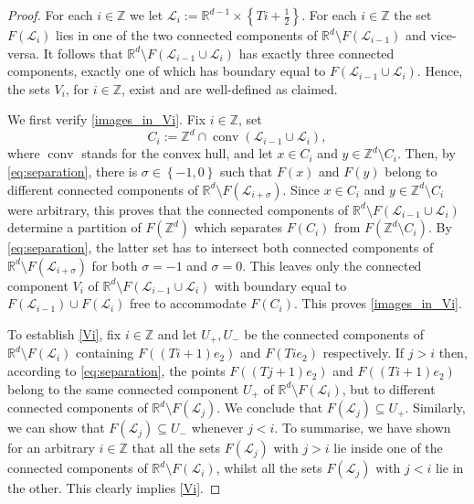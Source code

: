 \documentclass[a4paper, bibliography=totoc]{scrartcl}
\numberwithin{claimcounter}{define}
\newcommand{\R}{\mathbb{R}}
\newcommand{\Z}{\mathbb{Z}}
\DeclareMathOperator{\conv}{conv}
\newcommand{\mc}[1]{\mathcal{#1}}
\newcommand{\set}[1]{\left\{#1\right\}}
\newcommand{\br}[1]{\left(#1\right)}
\begin{document}
\begin{proof}
	For each $i\in\Z$ we let $\mc{L}_{i}:=\R^{d-1}\times\set{Ti+\frac{1}{2}}$. For each $i\in\Z$ the set $F(\mc{L}_{i})$ lies in one of the two connected components of $\R^{d}\setminus F(\mc{L}_{i-1})$ and vice-versa. It follows that $\R^{d}\setminus F\br{\mc{L}_{i-1}\cup\mc{L}_{i}}$ has exactly three connected components, exactly one of which has boundary equal to $F(\mc{L}_{i-1}\cup\mc{L}_{i})$. Hence, the sets $V_{i}$, for $i\in\Z$, exist and are well-defined as claimed.
	
	We first verify  \eqref{images_in_Vi}. Fix $i\in\Z$, set 
	\begin{equation*}
	C_{i}:=\Z^{d}\cap \conv\br{\mc{L}_{i-1}\cup\mc{L}_{i}},
	\end{equation*}
	where $\conv$ stands for the convex hull, and let $x\in C_{i}$ and $y\in \Z^{d}\setminus C_{i}$.
	Then, by \eqref{eq:separation}, there is $\sigma\in\set{-1,0}$ such that $F(x)$ and $F(y)$ belong to different connected components of $\R^{d}\setminus F(\mc{L}_{i+\sigma})$. Since $x\in C_{i}$ and $y\in \Z^{d}\setminus C_{i}$ were arbitrary, this proves that the connected components of $\R^{d}\setminus F(\mc{L}_{i-1}\cup \mc{L}_{i})$ determine a partition of $F(\Z^{d})$ which separates $F\br{C_{i}}$ from $F\br{\Z^{d}\setminus C_{i}}$. By \eqref{eq:separation}, the latter set has to intersect both connected components of $\R^{d}\setminus F(\mc{L}_{i+\sigma})$ for both $\sigma=-1$ and $\sigma=0$. This leaves only the connected component $V_{i}$ of $\R^{d}\setminus F(\mc{L}_{i-1}\cup \mc{L}_{i})$ with boundary equal to $F(\mc{L}_{i-1})\cup F(\mc{L}_{i})$ free to accommodate $F\br{C_{i}}$. This proves \eqref{images_in_Vi}.	
	
	To establish \eqref{Vi}, fix $i\in \Z$ and let $U_{+},U_{-}$ be the connected components of $\R^{d}\setminus F\br{\mc{L}_{i}}$ containing $F\br{\br{Ti+1}e_{2}}$ and $F\br{Tie_{2}}$ respectively. If $j>i$ then, according to \eqref{eq:separation}, the points $F\br{\br{Tj+1}e_{2}}$ and $F\br{\br{Ti+1}e_{2}}$ belong to the same connected component $U_{+}$ of $\R^{d}\setminus F\br{\mc{L}_{i}}$, but to different connected components of $\R^{d}\setminus F\br{\mc{L}_{j}}$. We conclude that $F\br{\mc{L}_{j}}\subseteq U_{+}$. Similarly, we can show that $F\br{\mc{L}_{j}}\subseteq U_{-}$ whenever $j<i$. To summarise, we have shown for an arbitrary $i\in\Z$ that all the sets $F(\mc{L}_{j})$ with $j>i$ lie inside one of the connected components of $\R^{d}\setminus F(\mc{L}_{i})$, whilst all the sets $F(\mc{L}_{j})$ with $j<i$ lie in the other. This clearly implies \eqref{Vi}.
\end{proof}
\end{document}

